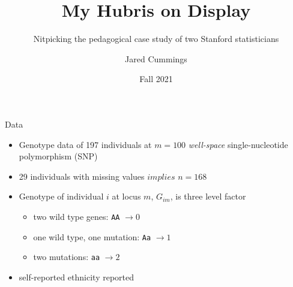 \documentclass{beamer}
\title{\LARGE{My Hubris on Display}}
\subtitle{Nitpicking the pedagogical case study of two Stanford statisticians}
\author{Jared Cummings}
\date{Fall 2021}
\begin{document}
\maketitle

\begin{frame}{Data}
\begin{itemize}
    \item \small{Genotype data of 197 individuals at $m=100$ \textit{well-space} single-nucleotide polymorphism (SNP)}
    \item 29 individuals with missing values $implies$ $n = 168$
    \item Genotype of individual $i$ at locus $m$, $G_{im}$, is three level factor
    \begin{itemize}
        \item \tiny{two wild type genes: \texttt{AA} $\rightarrow 0$}
        \item one wild type, one mutation: \texttt{Aa} $\rightarrow 1$
        \item two mutations: \texttt{aa} $\rightarrow 2$
    \end{itemize}
    \item self-reported ethnicity reported
\end{itemize}


\begin{table}[h]
\centering
\label{tab:data_example}
\caption{\tiny{A subset of genotype data on 197 individuals, each with measurements at 100 SNPs. Each individuals \texttt{ethnicity} is known to be one of \texttt{Japanese}, \texttt{African}, \texttt{African American}, and \texttt{European}.}}
\end{table}

\end{frame}
\end{document}
